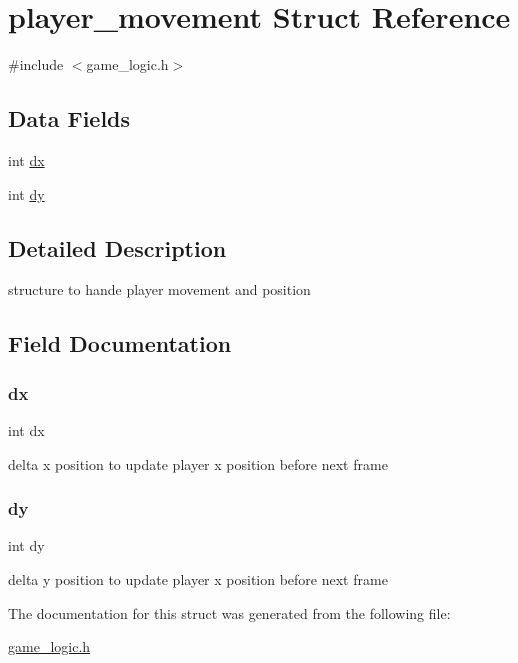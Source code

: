 \hypertarget{structplayer__movement}{}\section{player\+\_\+movement Struct Reference}
\label{structplayer__movement}


{\ttfamily \#include $<$game\+\_\+logic.\+h$>$}

\subsection*{Data Fields}
\begin{DoxyCompactItemize}
\item 
int \mbox{\hyperlink{structplayer__movement_a6a0d40b2ed6d9e674f93396212f0028f}{dx}}
\item 
int \mbox{\hyperlink{structplayer__movement_a4817151aee120cc100c400d3076f4b93}{dy}}
\end{DoxyCompactItemize}


\subsection{Detailed Description}
structure to hande player movement and position 

\subsection{Field Documentation}
\mbox{\label{structplayer__movement_a6a0d40b2ed6d9e674f93396212f0028f}} 
\subsubsection{\texorpdfstring{dx}{dx}}
{\footnotesize\ttfamily int dx}

delta x position to update player x position before next frame \mbox{\label{structplayer__movement_a4817151aee120cc100c400d3076f4b93}} 
\subsubsection{\texorpdfstring{dy}{dy}}
{\footnotesize\ttfamily int dy}

delta y position to update player x position before next frame 

The documentation for this struct was generated from the following file\+:\begin{DoxyCompactItemize}
\item 
\mbox{\hyperlink{game__logic_8h}{game\+\_\+logic.\+h}}\end{DoxyCompactItemize}
